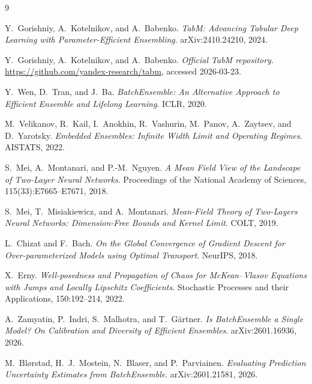 \documentclass[11pt]{article}
\theoremstyle{definition}
\begin{document}
\begin{thebibliography}{9}

Y.~Gorishniy, A.~Kotelnikov, and A.~Babenko.
\newblock \emph{TabM: Advancing Tabular Deep Learning with Parameter-Efficient Ensembling}.
\newblock arXiv:2410.24210, 2024.

Y.~Gorishniy, A.~Kotelnikov, and A.~Babenko.
\newblock \emph{Official TabM repository}.
\newblock \url{https://github.com/yandex-research/tabm}, accessed 2026-03-23.

Y.~Wen, D.~Tran, and J.~Ba.
\newblock \emph{BatchEnsemble: An Alternative Approach to Efficient Ensemble and Lifelong Learning}.
\newblock ICLR, 2020.

M.~Velikanov, R.~Kail, I.~Anokhin, R.~Vashurin, M.~Panov, A.~Zaytsev, and D.~Yarotsky.
\newblock \emph{Embedded Ensembles: Infinite Width Limit and Operating Regimes}.
\newblock AISTATS, 2022.

S.~Mei, A.~Montanari, and P.-M.~Nguyen.
\newblock \emph{A Mean Field View of the Landscape of Two-Layer Neural Networks}.
\newblock Proceedings of the National Academy of Sciences, 115(33):E7665--E7671, 2018.

S.~Mei, T.~Misiakiewicz, and A.~Montanari.
\newblock \emph{Mean-Field Theory of Two-Layers Neural Networks: Dimension-Free Bounds and Kernel Limit}.
\newblock COLT, 2019.

L.~Chizat and F.~Bach.
\newblock \emph{On the Global Convergence of Gradient Descent for Over-parameterized Models using Optimal Transport}.
\newblock NeurIPS, 2018.

X.~Erny.
\newblock \emph{Well-posedness and Propagation of Chaos for McKean--Vlasov Equations with Jumps and Locally Lipschitz Coefficients}.
\newblock Stochastic Processes and their Applications, 150:192--214, 2022.

A.~Zamyatin, P.~Indri, S.~Malhotra, and T.~G\"artner.
\newblock \emph{Is BatchEnsemble a Single Model? On Calibration and Diversity of Efficient Ensembles}.
\newblock arXiv:2601.16936, 2026.

M.~Bl{\o}rstad, H.~J.~Mostein, N.~Blaser, and P.~Parviainen.
\newblock \emph{Evaluating Prediction Uncertainty Estimates from BatchEnsemble}.
\newblock arXiv:2601.21581, 2026.

\end{thebibliography}
\end{document}
